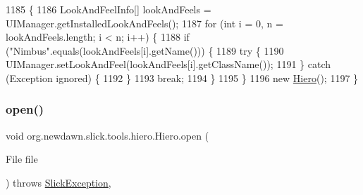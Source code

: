 \begin{DoxyCode}
1185                                                              \{
1186         LookAndFeelInfo[] lookAndFeels = UIManager.getInstalledLookAndFeels();
1187         \textcolor{keywordflow}{for} (\textcolor{keywordtype}{int} i = 0, n = lookAndFeels.length; i < n; i++) \{
1188             \textcolor{keywordflow}{if} (\textcolor{stringliteral}{"Nimbus"}.equals(lookAndFeels[i].getName())) \{
1189                 \textcolor{keywordflow}{try} \{
1190                     UIManager.setLookAndFeel(lookAndFeels[i].getClassName());
1191                 \} \textcolor{keywordflow}{catch} (Exception ignored) \{
1192                 \}
1193                 \textcolor{keywordflow}{break};
1194             \}
1195         \}
1196         \textcolor{keyword}{new} \mbox{\hyperlink{classorg_1_1newdawn_1_1slick_1_1tools_1_1hiero_1_1_hiero_ad35908dac0e9755fd418874dff6d2dcd}{Hiero}}();
1197     \}
\end{DoxyCode}
\mbox{\label{classorg_1_1newdawn_1_1slick_1_1tools_1_1hiero_1_1_hiero_a12c8a8bdd2025e9f45f487f773789ff8}} 
\subsubsection{\texorpdfstring{open()}{open()}}
{\footnotesize\ttfamily void org.\+newdawn.\+slick.\+tools.\+hiero.\+Hiero.\+open (\begin{DoxyParamCaption}\item[{File}]{file }\end{DoxyParamCaption}) throws \mbox{\hyperlink{classorg_1_1newdawn_1_1slick_1_1_slick_exception}{Slick\+Exception}}\hspace{0.3cm}{\ttfamily [inline]}, {\ttfamily [package]}}


